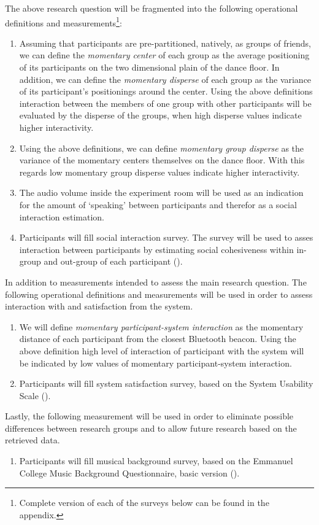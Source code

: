 \documentclass[a4paper,11pt]{article}
\newcommand{\definition}[1]{\emph{#1}}
\begin{document}
The above research question will be fragmented into the following operational definitions and measurements\footnote{Complete version of each of the surveys below can be found in the appendix.}:
\begin{enumerate}
	\item \label{measure:disperse} Assuming that participants are pre-partitioned, natively, as groups of friends, we can define the \definition{momentary center} of each group as the average positioning of its participants on the two dimensional plain of the dance floor.
	In addition, we can define the \definition{momentary disperse} of each group as the variance of its participant's positionings around the center.
	Using the above definitions interaction between the members of one group with other participants will be evaluated by the disperse of the groups, when high disperse values indicate higher interactivity.
	\item \label{measure:groups} Using the above definitions, we can define \definition{momentary group disperse} as the variance of the momentary centers themselves on the dance floor.
	With this regards low momentary group disperse values indicate higher interactivity.
	\item \label{measure:audio} The audio volume inside the experiment room will be used as an indication for the amount of `speaking' between participants and therefor as a social interaction estimation.
	\item \label{measure:survey:social} Participants will fill social interaction survey.
	The survey will be used to asses interaction between participants by estimating social cohesiveness within in-group and out-group of each participant ().
\end{enumerate}
In addition to measurements intended to assess the main research question.
The following operational definitions and measurements will be used in order to assess interaction with and satisfaction from the system.
\begin{enumerate}[resume]
	\item \label{measure:system} We will define \definition{momentary participant-system interaction} as the momentary distance of each participant from the closest Bluetooth beacon.
	Using the above definition high level of interaction of participant with the system will be indicated by low values of momentary participant-system interaction.
	\item \label{measure:survey:usability} Participants will fill system satisfaction survey, based on the System Usability Scale (\cite{brooke96}).
\end{enumerate}
Lastly, the following measurement will be used in order to eliminate possible differences between research groups and to allow future research based on the retrieved data.
\begin{enumerate}[resume]
	\item \label{measure:survey:musical} Participants will fill musical background survey, based on the Emmanuel College Music Background Questionnaire, basic version (\cite{web:zhao12}).
\end{enumerate}
\end{document}
